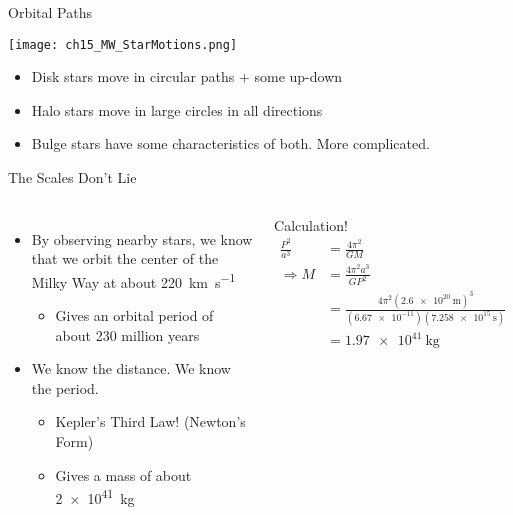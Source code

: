\documentclass[pdf,aspectratio=169]{beamer}
\begin{document}
\begin{frame}{Orbital Paths}
  \begin{center}
	\texttt{[image: ch15\_MW\_StarMotions.png]}
  \end{center}
  \begin{itemize}
	\item Disk stars move in circular paths + some up-down
	\item Halo stars move in large circles in all directions
	\item Bulge stars have some characteristics of both. More complicated.
  \end{itemize}
\end{frame}

\begin{frame}{The Scales Don't Lie}
  \begin{columns}
	\begin{itemize}
	  \item By observing nearby stars, we know that we orbit the center of the Milky Way at about \SI{220}{\kilo\meter\per\second}
		\begin{itemize}
		  \item Gives an orbital period of about 230 million years
		\end{itemize}
	  \item We know the distance. We know the period.
		\begin{itemize}
		  \item Kepler's Third Law! (Newton's Form)
		  \item Gives a mass of about \SI{2e41}{\kilo\gram}
		\end{itemize}
	\end{itemize}
	\begin{block}{Calculation!}
	  \begin{align*}
		\frac{P^2}{a^3} &= \frac{4\pi^2}{GM} \\
		\Rightarrow M &= \frac{4\pi^2 a^3}{G P^2} \\
		&= \frac{4\pi^2 \left(\SI{2.6e20}{\meter} \right)^3}{(\num{6.67e-11})(\SI{7.258e15}{\second})} \\
		&= \SI{1.97e41}{\kilo\gram}
	  \end{align*}
	\end{block}
  \end{columns}
\end{frame}
\end{document}
